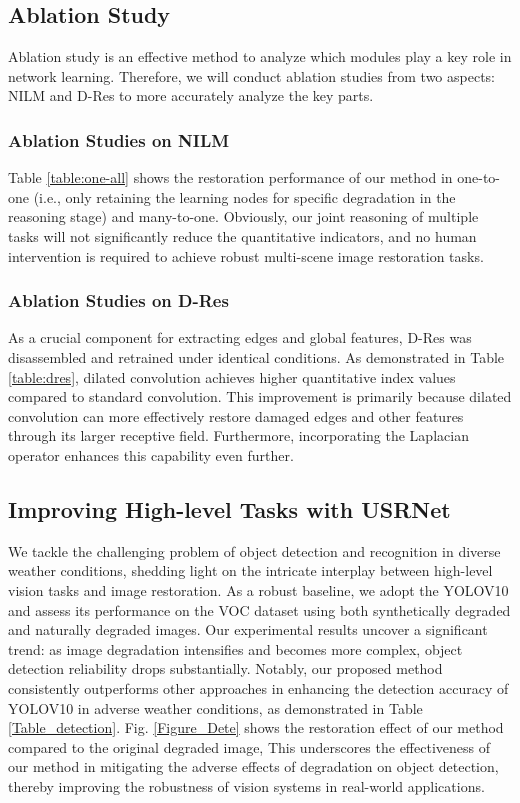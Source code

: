 \documentclass[final,12pt]{elsarticle}
\begin{document}
\subsection{Ablation Study}\label{as}
    Ablation study is an effective method to analyze which modules play a key role in network learning. Therefore, we will conduct ablation studies from two aspects: NILM and D-Res to more accurately analyze the key parts.
\subsubsection{Ablation Studies on NILM}
    Table \ref{table:one-all} shows the restoration performance of our method in one-to-one (i.e., only retaining the learning nodes for specific degradation in the reasoning stage) and many-to-one. Obviously, our joint reasoning of multiple tasks will not significantly reduce the quantitative indicators, and no human intervention is required to achieve robust multi-scene image restoration tasks. 
\subsubsection{Ablation Studies on D-Res}
    As a crucial component for extracting edges and global features, D-Res was disassembled and retrained under identical conditions. As demonstrated in Table \ref{table:dres}, dilated convolution achieves higher quantitative index values compared to standard convolution. This improvement is primarily because dilated convolution can more effectively restore damaged edges and other features through its larger receptive field. Furthermore, incorporating the Laplacian operator enhances this capability even further.
\subsection{Improving High-level Tasks with USRNet}
    We tackle the challenging problem of object detection and recognition in diverse weather conditions, shedding light on the intricate interplay between high-level vision tasks and image restoration. As a robust baseline, we adopt the YOLOV10 \citep{wang2024yolov10} and assess its performance on the VOC dataset using both synthetically degraded and naturally degraded images. Our experimental results uncover a significant trend: as image degradation intensifies and becomes more complex, object detection reliability drops substantially. Notably, our proposed method consistently outperforms other approaches in enhancing the detection accuracy of YOLOV10 in adverse weather conditions, as demonstrated in Table \ref{Table_detection}. Fig. \ref{Figure_Dete} shows the restoration effect of our method compared to the original degraded image, This underscores the effectiveness of our method in mitigating the adverse effects of degradation on object detection, thereby improving the robustness of vision systems in real-world applications.
\end{document}
